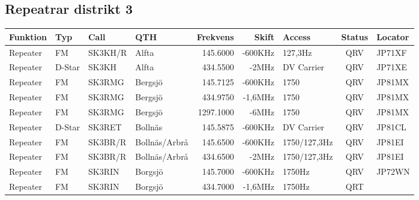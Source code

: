 \begin{landscape}
\subsection{Repeatrar distrikt 3}
\footnotesize
\begin{longtable}{llllrrlcl}
	\textbf{Funktion}         & \textbf{Typ}  & \textbf{Call} & \textbf{QTH}        & \textbf{Frekvens} & \textbf{Skift} & \textbf{Access}  & \textbf{Status} & \textbf{Locator} \\ \hline
	\endhead
	Repeater                  & FM            & SK3KH/R       & Alfta               & 145.6000          & -600KHz        & 127,3Hz          & QRV             & JP71XF           \\
	Repeater                  & D-Star        & SK3KH         & Alfta               & 434.5500          & -2MHz          & DV Carrier       & QRV             & JP71XE           \\
	Repeater                  & FM            & SK3RMG        & Bergsjö             & 145.7125          & -600KHz        & 1750             & QRV             & JP81MX           \\
	Repeater                  & FM            & SK3RMG        & Bergsjö             & 434.9750          & -1,6MHz        & 1750             & QRV             & JP81MX           \\
	Repeater                  & FM            & SK3RMG        & Bergsjö             & 1297.1000         & -6MHz          & 1750             & QRV             & JP81MX           \\
	Repeater                  & D-Star        & SK3RET        & Bollnäs             & 145.5875          & -600KHz        & DV Carrier       & QRV             & JP81CL           \\
	Repeater                  & FM            & SK3BR/R       & Bollnäs/Arbrå       & 145.6500          & -600KHz        & 1750/127,3Hz     & QRV             & JP81EI           \\
	Repeater                  & FM            & SK3BR/R       & Bollnäs/Arbrå       & 434.6500          & -2MHz          & 1750/127,3Hz     & QRV             & JP81EI           \\
	Repeater                  & FM            & SK3RIN        & Borgsjö             & 145.7000          & -600KHz        & 1750Hz           & QRV             & JP72WN           \\
	Repeater                  & FM            & SK3RIN        & Borgsjö             & 434.7000          & -1,6MHz        & 1750Hz           & QRT             & \\

\end{longtable}
\end{landscape}
